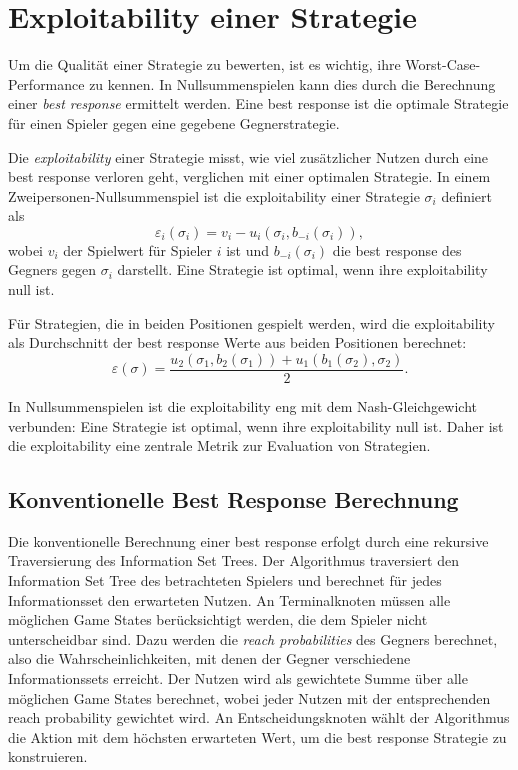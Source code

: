 \section{Exploitability einer Strategie}

Um die Qualität einer Strategie zu bewerten, ist es wichtig, ihre Worst-Case-Performance zu kennen.
In Nullsummenspielen kann dies durch die Berechnung einer \emph{best response} ermittelt werden.
Eine best response ist die optimale Strategie für einen Spieler gegen eine gegebene Gegnerstrategie.

Die \emph{exploitability} einer Strategie misst, wie viel zusätzlicher Nutzen durch eine best response verloren geht, verglichen mit einer optimalen Strategie.
In einem Zweipersonen-Nullsummenspiel ist die exploitability einer Strategie $\sigma_i$ definiert als
\begin{equation}
\varepsilon_i(\sigma_i) = v_i - u_i(\sigma_i, b_{-i}(\sigma_i)),
\end{equation}
wobei $v_i$ der Spielwert für Spieler $i$ ist und $b_{-i}(\sigma_i)$ die best response des Gegners gegen $\sigma_i$ darstellt.
Eine Strategie ist optimal, wenn ihre exploitability null ist.

Für Strategien, die in beiden Positionen gespielt werden, wird die exploitability als Durchschnitt der best response Werte aus beiden Positionen berechnet:
\begin{equation}
\varepsilon(\sigma) = \frac{u_2(\sigma_1, b_2(\sigma_1)) + u_1(b_1(\sigma_2), \sigma_2)}{2}.
\end{equation}

In Nullsummenspielen ist die exploitability eng mit dem Nash-Gleichgewicht verbunden: Eine Strategie ist optimal, wenn ihre exploitability null ist.
Daher ist die exploitability eine zentrale Metrik zur Evaluation von Strategien.

\subsection{Konventionelle Best Response Berechnung}

Die konventionelle Berechnung einer best response erfolgt durch eine rekursive Traversierung des Information Set Trees.
Der Algorithmus traversiert den Information Set Tree des betrachteten Spielers und berechnet für jedes Informationsset den erwarteten Nutzen.
An Terminalknoten müssen alle möglichen Game States berücksichtigt werden, die dem Spieler nicht unterscheidbar sind.
Dazu werden die \emph{reach probabilities} des Gegners berechnet, also die Wahrscheinlichkeiten, mit denen der Gegner verschiedene Informationssets erreicht.
Der Nutzen wird als gewichtete Summe über alle möglichen Game States berechnet, wobei jeder Nutzen mit der entsprechenden reach probability gewichtet wird.
An Entscheidungsknoten wählt der Algorithmus die Aktion mit dem höchsten erwarteten Wert, um die best response Strategie zu konstruieren.


